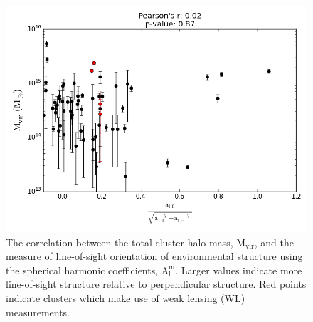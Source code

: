 \begin{figure}
\begin{center}
\includegraphics[width=\textwidth]{images/ClusterEnvironment/Mass_Corr2.png}
\end{center}
\caption[Mass - $\mathrm{A_{l}^{m}}$ Correlation]{The correlation between the total
cluster halo mass, $\mathrm{M_{vir}}$, and the measure of line-of-sight
orientation of environmental structure using the spherical harmonic
coefficients, $\mathrm{A_{l}^{m}}$. Larger values indicate more line-of-sight
structure relative to perpendicular structure. Red points indicate clusters
which make use of weak lensing (WL) measurements.}
\end{figure}

